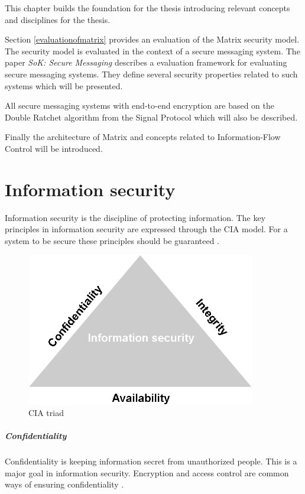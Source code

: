 
This chapter builds the foundation for the thesis introducing relevant concepts and disciplines for the thesis. 


Section \ref{evaluationofmatrix} provides an evaluation of the Matrix security model. The security model is evaluated in the context of a secure messaging system.  
The paper \emph{SoK: Secure Messaging} describes a evaluation framework for evaluating secure messaging systems. They define several security properties related to such systems \cite{sok} which will be presented.


All secure messaging systems with end-to-end encryption are based on the Double Ratchet algorithm from the Signal Protocol which will also be described.


Finally the architecture of Matrix and concepts related to Information-Flow Control will be introduced.

\section{Information security}

Information security is the discipline of protecting information. The key principles in information security are expressed through the CIA model. For a system to be secure these principles should be guaranteed \cite{michael2012}.

\begin{figure}[H]
	\centering
	\includegraphics[width=10cm]{figures/cia.png}
	\caption{CIA triad}
	\label{fig:CIA triad}
\end{figure}


\subparagraph{Confidentiality}
Confidentiality is keeping information secret from unauthorized people. This is a major goal in information security. Encryption and access control are common ways of ensuring confidentiality \cite{michael2012}.

